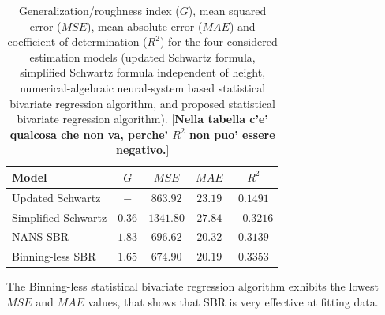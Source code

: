 \documentclass[10pt,final]{siamltex}
\begin{document}
\begin{table}[ht]
  \centering
  \begin{tabular}{|l|c|c|c|c|}
    \hline
    \textbf{Model}             &$\mathit{G}$  &$\mathit{MSE}$  &$\mathit{MAE}$  &$R^2$    \\
    \hline
    Updated Schwartz           &$ - $ &$863.92$  &$23.19$  &$ 0.1491$  \\
    Simplified Schwartz        &$0.36$  &$1341.80$ &$27.84$  &$-0.3216$  \\
    NANS SBR                   &$1.83$  &$696.62$  &$20.32$  &$ 0.3139$  \\
    Binning-less SBR           &$1.65$  &$674.90$  &$20.19$  &$ 0.3353$  \\
    \hline
  \end{tabular}
  \caption{Generalization/roughness index ($\mathit{G}$), mean squared error ($\mathit{MSE}$), mean absolute error ($\mathit{MAE}$) and coefficient of determination ($R^2$) for the four considered estimation models (updated Schwartz formula, simplified Schwartz formula independent of height, numerical-algebraic neural-system based statistical bivariate regression algorithm, and proposed statistical bivariate regression algorithm). [{\bf\red Nella tabella c'e' qualcosa che non va, perche' $R^2$ non puo' essere negativo.}]}
  \label{regstats}
\end{table}

The Binning-less statistical bivariate regression algorithm exhibits the lowest $\textit{MSE}$ and $\textit{MAE}$ values, that shows that SBR is very effective at fitting data.
%
\end{document}

